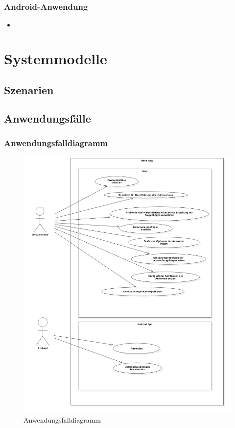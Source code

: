 \documentclass[a4paper]{scrreprt}
\begin{document}
        \vspace*{2cm}
        \subsection{Android-Anwendung}

            \begin{itemize}
                \item
            \end{itemize}

    \chapter{Systemmodelle}

        \section{Szenarien}

        \section{Anwendungsf\"alle}

            \newpage
            \subsection{Anwendungsfalldiagramm}
                \vspace{0.4cm}
                \begin{figure}
                    \centering
                    \includegraphics[scale = 0.4]{UseCaseDiagram1.jpg}
                    \caption{Anwendungsfalldiagramm}
                \end{figure}
\end{document}
